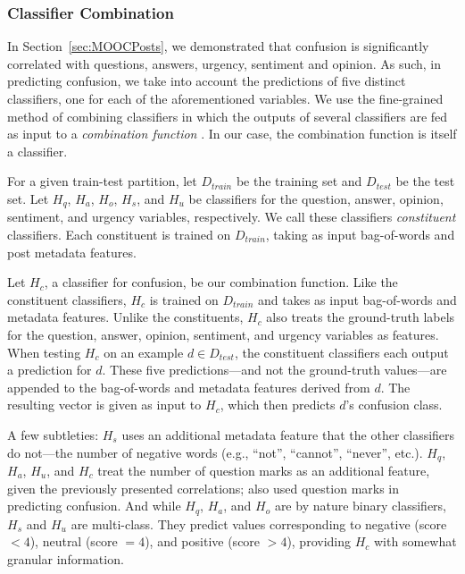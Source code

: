 \documentclass{edm_template}
\begin{document}
\subsubsection{Classifier Combination}
In Section~\ref{sec:MOOCPosts}, we demonstrated that confusion is significantly correlated with questions, answers, urgency, sentiment and opinion. As such, in predicting confusion, we take into account the predictions of five distinct classifiers, one for each of the aforementioned variables. We use the fine-grained method of combining classifiers in which the outputs of several classifiers are fed as input to a \emph{combination function} \cite{bennett2005combination}. In our case, the combination function is itself a classifier.

For a given train-test partition, let $D_{train}$ be the training set and $D_{test}$ be the test set. Let $H_{q}$, $H_{a}$, $H_{o}$, $H_{s}$, and $H_{u}$ be classifiers for the question, answer, opinion, sentiment, and urgency variables, respectively. We call these classifiers \emph{constituent} classifiers. Each constituent is trained on $D_{train}$, taking as input bag-of-words and post metadata features.

Let $H_{c}$, a classifier for confusion, be our combination function. Like the constituent classifiers, $H_{c}$ is trained on $D_{train}$ and takes as input bag-of-words and metadata features. Unlike the constituents, $H_{c}$ also treats the ground-truth labels for the question, answer, opinion, sentiment, and urgency variables as features. When testing $H_{c}$ on an example $d \in D_{test}$, the constituent classifiers each output a prediction for $d$. These five predictions---and not the ground-truth values---are appended to the bag-of-words and metadata features derived from $d$. The resulting vector is given as input to $H_{c}$, which then predicts $d$'s confusion class.

A few subtleties: $H_{s}$ uses an additional metadata feature that the other classifiers do not---the number of negative words (e.g., ``not'', ``cannot'', ``never'', etc.). $H_{q}$, $H_{a}$, $H_{u}$, and $H_{c}$ treat the number of question marks as an additional feature, given the previously presented correlations; \cite{wen2015confusion} also used question marks in predicting confusion. And while $H_{q}$, $H_{a}$, and $H_{o}$ are by nature binary classifiers, $H_{s}$ and $H_{u}$ are multi-class. They predict values corresponding to negative (score $< 4$), neutral (score $= 4$), and positive (score $> 4$), providing $H_{c}$ with somewhat granular information.
\end{document}
